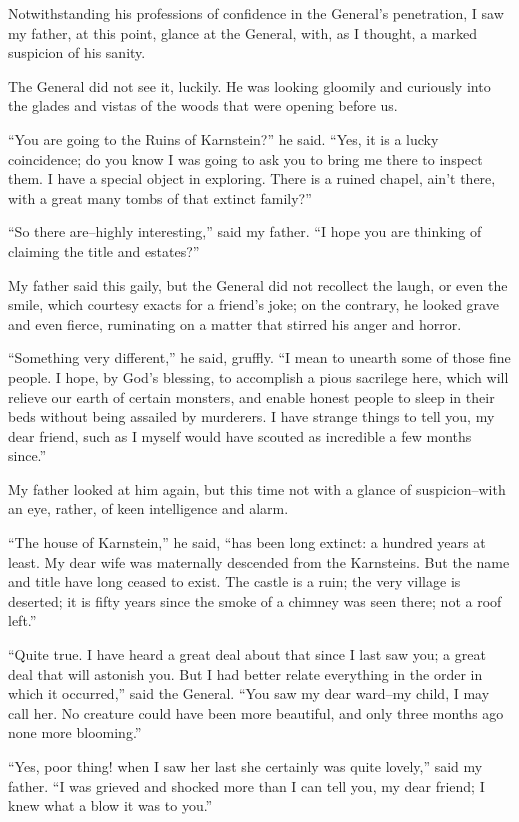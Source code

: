 \documentclass[11pt,twoside,makeidx,hidelinks,]{memoir}
\begin{document}
Notwithstanding his professions of confidence in the General's
penetration, I saw my father, at this point, glance at the General,
with, as I thought, a marked suspicion of his sanity.

The General did not see it, luckily. He was looking gloomily and
curiously into the glades and vistas of the woods that were opening
before us.

``You are going to the Ruins of Karnstein?'' he said. ``Yes, it is a lucky
coincidence; do you know I was going to ask you to bring me there to
inspect them. I have a special object in exploring. There is a ruined
chapel, ain't there, with a great many tombs of that extinct family?''

``So there are--highly interesting,'' said my father. ``I hope you are
thinking of claiming the title and estates?''

My father said this gaily, but the General did not recollect the laugh,
or even the smile, which courtesy exacts for a friend's joke; on the
contrary, he looked grave and even fierce, ruminating on a matter that
stirred his anger and horror.

``Something very different,'' he said, gruffly. ``I mean to unearth some of
those fine people. I hope, by God's blessing, to accomplish a pious
sacrilege here, which will relieve our earth of certain monsters, and
enable honest people to sleep in their beds without being assailed by
murderers. I have strange things to tell you, my dear friend, such as I
myself would have scouted as incredible a few months since.''

My father looked at him again, but this time not with a glance of
suspicion--with an eye, rather, of keen intelligence and alarm.

``The house of Karnstein,'' he said, ``has been long extinct: a hundred
years at least. My dear wife was maternally descended from the
Karnsteins. But the name and title have long ceased to exist. The castle
is a ruin; the very village is deserted; it is fifty years since the
smoke of a chimney was seen there; not a roof left.''

``Quite true. I have heard a great deal about that since I last saw you;
a great deal that will astonish you. But I had better relate everything
in the order in which it occurred,'' said the General. ``You saw my dear
ward--my child, I may call her. No creature could have been more
beautiful, and only three months ago none more blooming.''

``Yes, poor thing! when I saw her last she certainly was quite lovely,''
said my father. ``I was grieved and shocked more than I can tell you, my
dear friend; I knew what a blow it was to you.''
\end{document}
